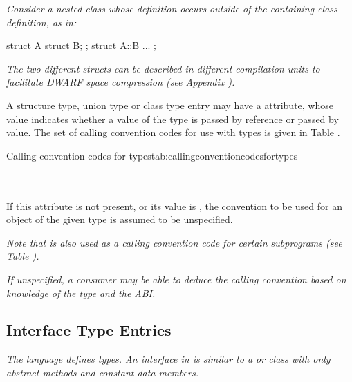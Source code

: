 \textit{Consider a nested class whose
definition occurs outside of the containing class definition, as in:}

\begin{nlnlisting}
struct A {
    struct B;
};
struct A::B { ... };
\end{nlnlisting}

\textit{The two different structs can be described in
different compilation units to
facilitate DWARF space compression
(see Appendix ).}

A structure type, union type or class type entry may have a
\DWATcallingconventionDEFN{} attribute,
whose value indicates whether a value of the type
is passed by reference
or passed by value. The set of calling convention codes for use with types
is\hypertarget{chap:DWATcallingconventionfortypes}{}
given in Table .

\begin{simplenametable}[2.2in]{Calling convention codes for types}{tab:callingconventioncodesfortypes}
\DWCCnormal             \\
\DWCCpassbyvalueTARG        \\
\DWCCpassbyreferenceTARG    \\
\end{simplenametable}

If this attribute is not present, or its value is
\DWCCnormalNAME, the convention to be used for an object of the
given type is assumed to be unspecified.

\textit{Note that \DWCCnormalNAME{} is also used as a calling convention
code for certain subprograms
(see Table ).}

\textit{If unspecified, a consumer may be able to deduce the calling
convention based on knowledge of the type and the ABI.}


\subsection{Interface Type Entries}
\label{chap:interfacetypeentries}

\textit{The  language defines  types.
An interface
in  is similar to a  or
 class with only abstract
methods and constant data members.}

